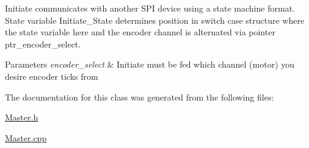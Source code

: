 Initiate communicates with another S\-P\-I device using a state machine format. State variable Initiate\-\_\-\-State determines position in switch case structure where the state variable here and the encoder channel is alternated via pointer ptr\-\_\-encoder\-\_\-select. 
\begin{DoxyParams}{Parameters}
{\em encoder\-\_\-select} & Initiate must be fed which channel (motor) you desire encoder ticks from \\
\hline
\end{DoxyParams}


The documentation for this class was generated from the following files\-:\begin{DoxyCompactItemize}
\item 
\hyperlink{_master_8h}{Master.\-h}\item 
\hyperlink{_master_8cpp}{Master.\-cpp}\end{DoxyCompactItemize}

